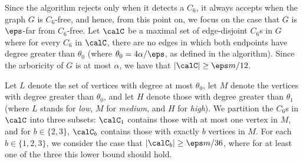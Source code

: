 Since the algorithm rejects only when it detects a $C_6$, it always accepts when the graph $G$ is $C_6$-free, and hence, from this point on, we focus on the case that $G$ is $\eps$-far from $C_6$-free.
Let $\calC$ be a maximal set of edge-disjoint $C_6$s in $G$ where for every $C_6$ in $\calC$, there are no edges in which both endpoints have degree greater than $\theta_0$
(where $\theta_0 = 4\alpha/\eps$, as defined in the algorithm).
Since the arboricity of $G$ is at most $\alpha$, 
we have that $|\calC| \geq \eps m/12$. 

Let $L$ denote the set of vertices with degree at most $\theta_0$, let $M$ denote the vertices with degree greater than $\theta_0$, and let $H$ denote those with degree greater than $\theta_1$ (where $L$ stands for \emph{low}, $M$ for \emph{medium}, and $H$ for \emph{high}).
 We partition the $C_6$s in $\calC$ into three subsets:  $\calC_1$ contains those with at most one vertex in $M$,  and for $b\in \{2,3\}$, $\calC_b$ contains those with exactly $b$ vertices in $M$. For each $b\in \{1,2,3\} $, we consider the case that $|\calC_b| \geq \eps m/36$, where for at least one of the three this lower bound should hold. %

